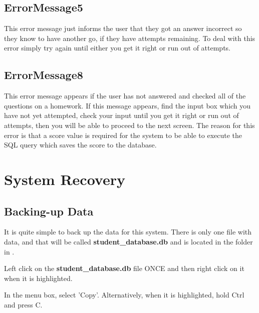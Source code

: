 \subsection{ErrorMessage5}

This error message just informs the user that they got an answer incorrect so they know to have another go, if they have attempts remaining. To deal with this error simply try again until either you get it right or run out of attempts.


\subsection{ErrorMessage8}

This error message appears if the user has not answered and checked all of the questions on a homework. If this message appears, find the input box which you have not yet attempted, check your input until you get it right or run out of attempts, then you will be able to proceed to the next screen. The reason for this error is that a score value is required for the system to be able to execute the SQL query which saves the score to the database.







\section{System Recovery}

\subsection{Backing-up Data}

It is quite simple to back up the data for this system. There is only one file with data, and that will be called \textbf{student\_database.db} and is located in the {} folder in {}.


Left click on the \textbf{student\_database.db} file ONCE and then right click on it when it is highlighted.


In the menu box, select 'Copy'. Alternatively, when it is highlighted, hold Ctrl and press C.


